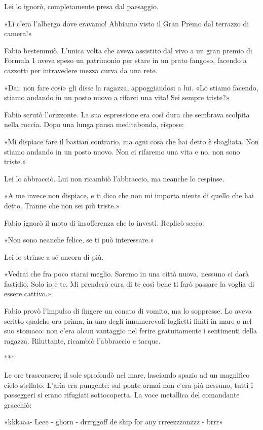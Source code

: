 Lei lo ignorò, completamente presa dal paesaggio.

«Lì c'era l'albergo dove eravamo! Abbiamo visto il Gran Premo dal terrazzo di camera!»

Fabio bestemmiò. L'unica volta che aveva assistito dal vivo a un gran premio di Formula 1 aveva speso un patrimonio per stare in un prato fangoso, facendo a cazzotti per intravedere mezza curva da una rete.

«Dai, non fare così» gli disse la ragazza, appoggiandosi a lui. «Lo stiamo facendo, stiamo andando in un posto nuovo a rifarci una vita! Sei sempre triste?»

Fabio scrutò l'orizzonte. La sua espressione era così dura che sembrava scolpita nella roccia. Dopo una lunga pausa meditabonda, rispose:

«Mi dispiace fare il bastian contrario, ma ogni cosa che hai detto è sbagliata. Non stiamo andando in un posto nuovo. Non ci rifaremo una vita e no, non sono triste.»

Lei lo abbracciò. Lui non ricambiò l'abbraccio, ma neanche lo respinse.

«A me invece non dispiace, e ti dico che non mi importa niente di quello che hai detto. Tranne che non sei più triste.»

Fabio ignorò il moto di insofferenza che lo investì. Replicò secco:

«Non sono neanche felice, se ti può interessare.»

Lei lo strinse a sé ancora di più.

«Vedrai che fra poco starai meglio. Saremo in una città nuova, nessuno ci darà fastidio. Solo io e te. Mi prenderò cura di te così bene ti farò passare la voglia di essere cattivo.»

Fabio provò l'impulso di fingere un conato di vomito, ma lo soppresse. Lo aveva scritto qualche ora prima, in uno degli innumerevoli foglietti finiti in mare o nel suo stomaco: non c'era alcun vantaggio nel ferire gratuitamente i sentimenti della ragazza. Riluttante, ricambiò l'abbraccio e tacque.

***

Le ore trascorsero; il sole sprofondò nel mare, lasciando spazio ad un magnifico cielo stellato. L'aria era pungente: sul ponte ormai non c'era più nessuno, tutti i passeggeri si erano rifugiati sottocoperta. La voce metallica del comandante gracchiò:

«kkkaaa- Leee - ghorn - drrrggoff de ship for any rrreezzzonzzz - brrr»

